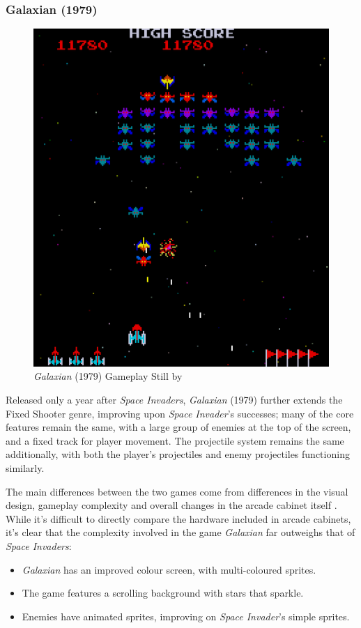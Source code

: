 \documentclass{scrartcl}
\let\cite\textcite
\let\citep\autocite
\begin{document}
\subsubsection{Galaxian (1979)}

\begin{figure}[ht]
  \centering
  \includegraphics[width=.6\columnwidth]{Galaxian.png}
  \caption[\textit{Galaxian}]{\textit{Galaxian} (1979) Gameplay Still by \cite{Wikimedia001}}
\end{figure}


Released only a year after \textit{Space Invaders}, \textit{Galaxian} (1979) further extends the Fixed Shooter genre, improving upon \textit{Space Invader}'s successes; many of the core features remain the same, with a large group of enemies at the top of the screen, and a fixed track for player movement. The projectile system remains the same additionally, with both the player's projectiles and enemy projectiles functioning similarly.

The main differences between the two games come from differences in the visual design, gameplay complexity and overall changes in the arcade cabinet itself \citep{Youtube002}. While it's difficult to directly compare the hardware included in arcade cabinets, it's clear that the complexity involved in the game \textit{Galaxian} far outweighs that of \textit{Space Invaders}:

\begin{itemize}
  \item \textit{Galaxian} has an improved colour screen, with multi-coloured sprites.
  \item The game features a scrolling background with stars that sparkle.
  \item Enemies have animated sprites, improving on \textit{Space Invader}'s simple sprites.
\end{itemize}
\end{document}
